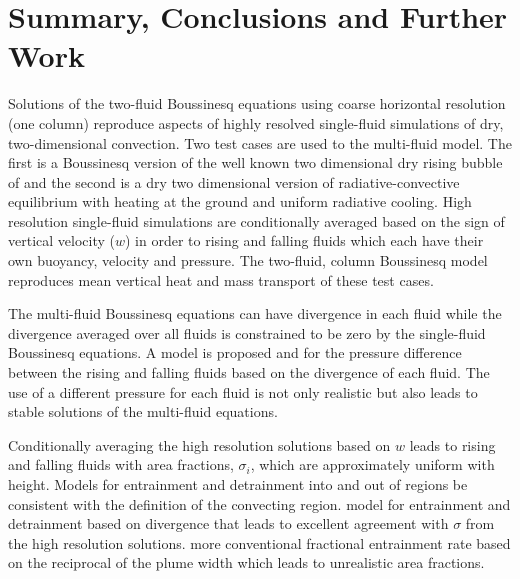 \documentclass[draft]{agujournal2019}
\begin{document}
  

\section{Summary, Conclusions and Further Work \label{sec:concs}}

{Solutions of the two-fluid Boussinesq equations using coarse horizontal resolution (one column) reproduce aspects of highly resolved single-fluid simulations of dry, two-dimensional convection.}
Two test cases are used to 
the multi-fluid model. The first is a Boussinesq version of the well
known two dimensional dry rising bubble of  and the second
is a dry two dimensional version of radiative-convective equilibrium
with heating at the ground and uniform radiative cooling. High resolution
single-fluid simulations are conditionally averaged based on the sign
of vertical velocity ($w$) in order to  rising and falling fluids which each have their own  buoyancy, velocity and pressure. The two-fluid,  column Boussinesq model reproduces mean vertical heat and mass transport of these test cases. 

The multi-fluid Boussinesq equations can have divergence in each fluid
while the divergence averaged over all fluids is 
{constrained to be zero by the single-fluid Boussinesq equations.}
A model is proposed and  for the pressure difference between the rising
and falling fluids based on the divergence of each fluid. The use
of a different pressure for each fluid is not only realistic but also
leads to stable solutions of the multi-fluid equations. 

Conditionally averaging the high resolution solutions based on $w$
leads to
{rising and falling fluids} with area fractions,
$\sigma_{i}$, which are approximately uniform with height. Models
for entrainment and detrainment into and out of  regions
 be consistent with the definition of the convecting region.
 model for entrainment and detrainment based on divergence 
that leads to excellent agreement with $\sigma$ from the high resolution
solutions.  more conventional fractional entrainment rate based on the reciprocal of the plume width  which leads to unrealistic  area fractions. 
\end{document}
